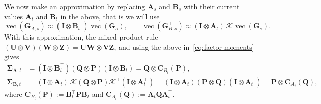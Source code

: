 \documentclass[11pt]{article}
\renewcommand{\vec}{\operatorname{vec}}
\newcommand{\mat}[1]{\bm{#1}}
\begin{document}
We now make an approximation by replacing $\mat{A}_s$ and $\mat{B}_s$ with their current values $\mat{A}_t$ and $\mat{B}_t$ in the above, that is we will use
\[
  \vec(\mat{G}_{A,s}) \approx (\mat{I} \otimes \mat{B}_t^\top)\vec(\mat{G}_s),
  \qquad
  \vec(\mat{G}_{B,s}^\top) 
    \approx (\mat{I} \otimes \mat{A}_t)\,\mathcal{K}\vec(\mat{G}_s).
\]
 With this approximation, the mixed-product rule $(\mat{U} \otimes \mat{V})(\mat{W} \otimes \mat{Z}) = \mat{U}\mat{W} \otimes \mat{VZ}$, and
using the above in~\eqref{eq:factor-moments} gives
\begin{equation}\label{eq:observable-moments}
\begin{aligned}
  \overline{\mat{\Sigma}}_{\mat{A},t} &= (\mat{I} \otimes \mat{B}_t^\top)(\mat{Q} \otimes \mat{P})(\mat{I} \otimes \mat{B}_t) = \mat{Q}\otimes \mat{C}_{B_t}(\mat{P}),\\
  \overline{\mat{\Sigma}}_{\mat{B},t} &= (\mat{I} \otimes \mat{A}_t)\,\mathcal{K}(\mat{Q} \otimes \mat{P})\mathcal{K}^\top(\mat{I} \otimes \mat{A}_t^\top) = (\mat{I} \otimes \mat{A}_t)(\mat{P} \otimes \mat{Q})(\mat{I} \otimes \mat{A}_t^\top) = \mat{P}\otimes \mat{C}_{A_t}(\mat{Q}),
\end{aligned}
\end{equation}
where $\mat{C}_{B_t}(\mat{P}):=\mat{B}_t^\top \mat{P} \mat{B}_t$ and $\mat{C}_{A_t}(\mat{Q}):=\mat{A}_t \mat{Q} \mat{A}_t^\top$.
\end{document}

